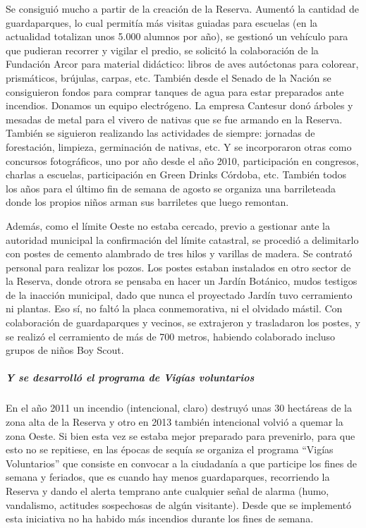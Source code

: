 \documentclass[
]{article}
\begin{document}
Se consiguió mucho a partir de la creación de la Reserva. Aumentó la
cantidad de guardaparques, lo cual permitía más visitas guiadas para
escuelas (en la actualidad totalizan unos 5.000 alumnos por año), se
gestionó un vehículo para que pudieran recorrer y vigilar el predio, se
solicitó la colaboración de la Fundación Arcor para material didáctico:
libros de aves autóctonas para colorear, prismáticos, brújulas, carpas,
etc. También desde el Senado de la Nación se consiguieron fondos para
comprar tanques de agua para estar preparados ante incendios. Donamos un
equipo electrógeno. La empresa Cantesur donó árboles y mesadas de metal
para el vivero de nativas que se fue armando en la Reserva. También se
siguieron realizando las actividades de siempre: jornadas de
forestación, limpieza, germinación de nativas, etc. Y se incorporaron
otras como concursos fotográficos, uno por año desde el año 2010,
participación en congresos, charlas a escuelas, participación en Green
Drinks Córdoba, etc. También todos los años para el último fin de semana
de agosto se organiza una barrileteada donde los propios niños arman sus
barriletes que luego remontan.

Además, como el límite Oeste no estaba cercado, previo a gestionar ante
la autoridad municipal la confirmación del límite catastral, se procedió
a delimitarlo con postes de cemento alambrado de tres hilos y varillas
de madera. Se contrató personal para realizar los pozos. Los postes
estaban instalados en otro sector de la Reserva, donde otrora se pensaba
en hacer un Jardín Botánico, mudos testigos de la inacción municipal,
dado que nunca el proyectado Jardín tuvo cerramiento ni plantas. Eso sí,
no faltó la placa conmemorativa, ni el olvidado mástil. Con colaboración
de guardaparques y vecinos, se extrajeron y trasladaron los postes, y se
realizó el cerramiento de más de 700 metros, habiendo colaborado incluso
grupos de niños Boy Scout.

\hypertarget{y-se-desarrolluxf3-el-programa-de-viguxedas-voluntarios}{%
\subparagraph{Y se desarrolló el programa de Vigías
voluntarios}\label{y-se-desarrolluxf3-el-programa-de-viguxedas-voluntarios}}

En el año 2011 un incendio (intencional, claro) destruyó unas 30
hectáreas de la zona alta de la Reserva y otro en 2013 también
intencional volvió a quemar la zona Oeste. Si bien esta vez se estaba
mejor preparado para prevenirlo, para que esto no se repitiese, en las
épocas de sequía se organiza el programa ``Vigías Voluntarios'' que
consiste en convocar a la ciudadanía a que participe los fines de semana
y feriados, que es cuando hay menos guardaparques, recorriendo la
Reserva y dando el alerta temprano ante cualquier señal de alarma (humo,
vandalismo, actitudes sospechosas de algún visitante). Desde que se
implementó esta iniciativa no ha habido más incendios durante los fines
de semana.
\end{document}
